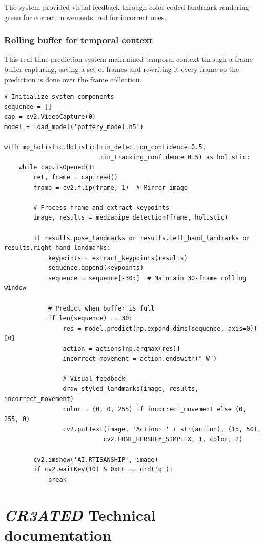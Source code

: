 The system provided visual feedback through color-coded landmark rendering - green for correct movements, red for incorrect ones.

\subsubsection{Rolling buffer for temporal context}

This real-time prediction system maintained temporal context through a frame buffer capturing, saving a set of frames and rewriting it every frame so the prediction is done over the frame collection.

\begin{verbatim}
# Initialize system components
sequence = []
cap = cv2.VideoCapture(0)
model = load_model('pottery_model.h5')

with mp_holistic.Holistic(min_detection_confidence=0.5, 
                          min_tracking_confidence=0.5) as holistic:
    while cap.isOpened():
        ret, frame = cap.read()
        frame = cv2.flip(frame, 1)  # Mirror image
        
        # Process frame and extract keypoints
        image, results = mediapipe_detection(frame, holistic)
        
        if results.pose_landmarks or results.left_hand_landmarks or results.right_hand_landmarks:
            keypoints = extract_keypoints(results)
            sequence.append(keypoints)
            sequence = sequence[-30:]  # Maintain 30-frame rolling window
            
            # Predict when buffer is full
            if len(sequence) == 30:
                res = model.predict(np.expand_dims(sequence, axis=0))[0]
                action = actions[np.argmax(res)]
                incorrect_movement = action.endswith("_W")
                
                # Visual feedback
                draw_styled_landmarks(image, results, incorrect_movement)
                color = (0, 0, 255) if incorrect_movement else (0, 255, 0)
                cv2.putText(image, 'Action: ' + str(action), (15, 50), 
                           cv2.FONT_HERSHEY_SIMPLEX, 1, color, 2)
        
        cv2.imshow('AI.RTISANSHIP', image)
        if cv2.waitKey(10) & 0xFF == ord('q'):
            break
\end{verbatim}

\clearpage
\section{\textit{CR3ATED} Technical documentation}

